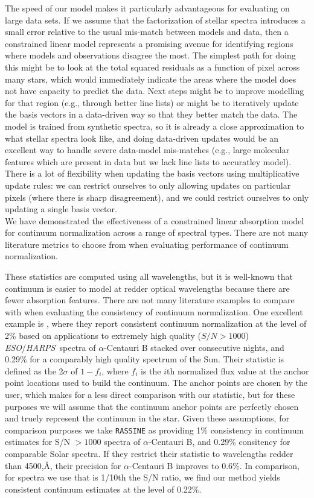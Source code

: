 \documentclass[modern]{aastex631}
\newcommand{\project}[1]{\textit{#1}}
\newcommand{\eso}{\project{ESO}}
\newcommand{\harps}{\project{HARPS}}
\begin{document}
The speed of our model makes it particularly advantageous for evaluating on large data sets. If we assume that the factorization of stellar spectra introduces a small error relative to the usual mis-match between models and data, then a constrained linear model represents a promising avenue for identifying regions where models and observations disagree the most. The simplest path for doing this might be to look at the total squared residuals as a function of pixel across many stars, which would immediately indicate the areas where the model does not have capacity to predict the data. Next steps might be to improve modelling for that region (e.g., through better line lists) or might be to iteratively update the basis vectors in a data-driven way so that they better match the data. The model is trained from synthetic spectra, so it is already a close approximation to what stellar spectra look like, and doing data-driven updates would be an excellent way to handle severe data-model mis-matches (e.g., large molecular features which are present in data but we lack line lists to accuratley model). There is a lot of flexibility when updating the basis vectors using multiplicative update rules: we can restrict ourselves to only allowing updates on particular pixels (where there is sharp disagreement), and we could restrict ourselves to only updating a single basis vector.\\

We have demonstrated the effectiveness of a constrained linear absorption model for continuum normalization across a range of spectral types. There are not many literature metrics to choose from when evaluating performance of continuum normalization. 


These statistics are computed using all wavelengths, but it is well-known that continuum is easier to model at redder optical wavelengths because there are fewer absorption features. There are not many literature examples to compare with when evaluating the consistency of continuum normalization. One excellent example is \citet{RASSINE}, where they report consistent continuum normalization at the level of 2\% based on applications to extremely high quality ($S/N > 1000$) \eso/\harps\ spectra of $\alpha$-Centauri B stacked over consecutive nights, and 0.29\% for a comparably high quality spectrum of the Sun. Their statistic is defined as the 2$\sigma$ of $1-f_i$, where $f_i$ is the $i$th normalized flux value at the anchor point locations used to build the continuum. The anchor points are chosen by the user, which makes for a less direct comparison with our statistic, but for these purposes we will assume that the continuum anchor points are perfectly chosen and truely represent the continuum in the star. Given these assumptions, for comparison purposes we take \texttt{RASSINE} as providing 1\% consistency in continuum estimates for S/N $> 1000$ spectra of $\alpha$-Centauri B, and 0.29\% consitency for comparable Solar spectra. If they restrict their statistic to wavelengths redder than 4500,\AA, their precision for $\alpha$-Centauri B improves to 0.6\%. In comparison, for spectra we use that is 1/10th the S/N ratio, we find our method yields consistent continuum estimates at the level of 0.22\%.\\
\end{document}
